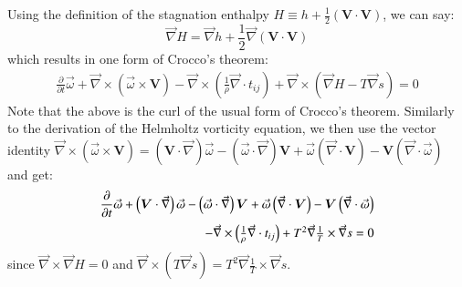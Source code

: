 \documentclass{warpdoc}
\newcommand{\alb}{\vspace{0.2cm}\\} %
\newcommand{\mfd}{\displaystyle}
\begin{document}
%
Using the definition of the stagnation enthalpy
$H \equiv h+\frac{1}{2} (\bm{V}\cdot\bm{V})$, we can say:
%
\begin{equation}
  \vec{\nabla}{H}=\vec{\nabla}h+\frac{1}{2} \vec{\nabla} (\bm{V}\cdot\bm{V})
\end{equation}
%
which results in one form of Crocco's theorem:
%
\begin{equation}
 \label{eqn:Crocco:vorticity4}
 \begin{array}{r}
  \mfd\frac{\partial}{\partial t} \vec{\omega}
       +\vec{\nabla} \times \left(\vec{\omega} \times \bm{V}\right)
      - \vec{\nabla} \times \left( \frac{1}{\rho} \vec{\nabla} \cdot t_{ij} \right)
      + \vec{\nabla} \times \left( \vec{\nabla} H - T \vec{\nabla} s
           \right)
      = 0
 \end{array}
\end{equation}
%
Note that the above is the curl of the usual form of Crocco's
theorem.
Similarly to the derivation of the Helmholtz vorticity equation,
we then use the vector identity
$\vec{\nabla} \times \left( \vec{\omega} \times \bm{V} \right) =
       \left( \bm{V} \cdot \vec{\nabla} \right) \vec{\omega}
      -\left( \vec{\omega} \cdot \vec{\nabla} \right) \bm{V}
      +\vec{\omega} \left( \vec{\nabla} \cdot \bm{V} \right)
      -\bm{V} \left( \vec{\nabla} \cdot \vec{\omega} \right)$ and get:
%
\begin{equation}
 \label{eqn:Crocco:vorticity5}
 \begin{array}{r}
  \mfd\frac{\partial}{\partial t} \vec{\omega}
      +\left( \bm{V} \cdot \vec{\nabla} \right) \vec{\omega}
      -\left( \vec{\omega} \cdot \vec{\nabla} \right) \bm{V}
      +\vec{\omega} \left( \vec{\nabla} \cdot \bm{V} \right)
      -\bm{V} \left( \vec{\nabla} \cdot \vec{\omega} \right) \alb
      - \vec{\nabla} \times \left( \frac{1}{\rho} \vec{\nabla} \cdot t_{ij} \right)
      + T^2 \vec{\nabla}\frac{1}{T} \times \vec{\nabla} s 
      = 0
 \end{array}
\end{equation}
%
since $\vec{\nabla} \times \vec{\nabla} H=0$ and
$\vec{\nabla} \times \left( T \vec{\nabla} s \right)=
T^2 \vec{\nabla}\frac{1}{T} \times \vec{\nabla} s $.




  
  
\end{document}
